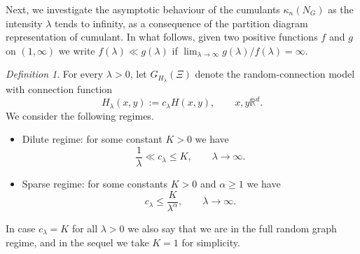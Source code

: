 \documentclass[bj,authoryear,noshowframe]{imsart}
\theoremstyle{plain}
\theoremstyle{remark}
\newtheorem{definition}[theorem]{Definition}
\newcommand{\R}{\mathbb{R}}
\def\real{{\mathord{\mathbb R}}}
\begin{document}
  
 \noindent
  Next, we investigate the asymptotic behaviour of the cumulants $\kappa_n(N_G)$
 as the intensity $\lambda$ tends to infinity, as a consequence of the partition diagram representation of cumulant. 
 In what follows, given two positive functions $f$ and $g$ on $(1,\infty )$ we write
 $f(\lambda ) \ll g(\lambda )$ if 
 $\lim_{\lambda \to \infty} g(\lambda ) / f(\lambda ) = \infty$.
 
 \vspace{-0.2cm}
 
 \begin{definition}
   For every $\lambda >0$,
   let $G_{H_\lambda} (\Xi)$
   denote the random-connection model
   with connection function 
   $$
   H_\lambda(x,y):= c_\lambda H(x,y),
   \qquad x,y \real^d.
   $$ 
 We consider the following regimes. 
 \begin{itemize}
 \item Dilute regime: for some constant $K>0$ we have 
 \begin{equation}
     \label{fjnldsf}
     \frac{1}{\lambda} \ll c_\lambda \leq K,
     \qquad
     \lambda\to \infty.
 \end{equation} 
 \item Sparse regime: for some constants $K>0$ and $\alpha \geq 1$ we have
   \begin{equation}
     \label{fjnldsf-2}
     c_\lambda \leq \frac{K}{\lambda^\alpha},
         \qquad
     \lambda\to \infty. 
     \end{equation} %
 \end{itemize} 
 \end{definition}
 
 \vspace{-0.4cm}
 
 \noindent
 In case $c_\lambda = K$ for all $\lambda > 0$
 we also say that we are in the full random graph regime,
 and in the sequel we take $K=1$ for simplicity.
 
\end{document}
